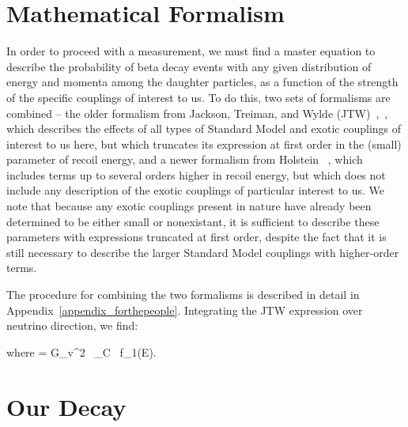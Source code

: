 \section{Mathematical Formalism}
	In order to proceed with a measurement, we must find a master equation to describe the probability of beta decay events with any given distribution of energy and momenta among the daughter particles, as a function of the strength of the specific couplings of interest to us.  To do this, two sets of formalisms are combined -- the older formalism from Jackson, Treiman, and Wylde (JTW)~\cite{jtw},~\cite{jtw_coulomb}, which describes the effects of all types of Standard Model and exotic couplings of interest to us here, but which truncates its expression at first order in the (small) parameter of recoil energy, and a newer formalism from Holstein ~\cite{holstein}, which includes terms up to several orders higher in recoil energy, but which does not include any description of the exotic couplings of particular interest to us.  We note that because any exotic couplings present in nature have already been determined to be either small or nonexistant, it is sufficient to describe these parameters with expressions truncated at first order, despite the fact that it is still necessary to describe the larger Standard Model couplings with higher-order terms. 
	
	The procedure for combining the two formalisms is described in detail in Appendix~\ref{appendix_forthepeople}.  
Integrating the JTW expression over neutrino direction, we find:

where 
\bea
\xi = G_v^2 \, \cos\theta_C \, f_1(E).
\eea



\section{Our Decay}

